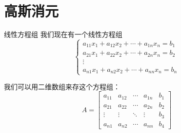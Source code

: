 \documentclass{beamer}
\begin{document}
\section{高斯消元}

\begin{frame}{线性方程组}
    我们现在有一个线性方程组
    \begin{equation*}
        \left\{
            \begin{array}{l}
                a_{11}x_1+a_{12}x_2+\cdots +a_{1n}x_n = b_1\\
                a_{21}x_1+a_{22}x_2+\cdots +a_{2n}x_n = b_2\\
                \vdots\\
                a_{n1}x_1+a_{n2}x_2+\cdots +a_{nn}x_n = b_n
            \end{array}
        \right.
    \end{equation*}

    我们可以用二维数组来存这个方程组：
    \begin{equation*}
        A=\begin{bmatrix}
            a_{11} & a_{12} & \cdots & a_{1n} & b_1\\
            a_{21} & a_{22} & \cdots & a_{2n} & b_2\\
            \vdots & \vdots & \ddots & \vdots & b_3\\
            a_{n1} & a_{n2} & \cdots & a_{nn} & b_4
        \end{bmatrix}
    \end{equation*}
\end{frame}
\end{document}

